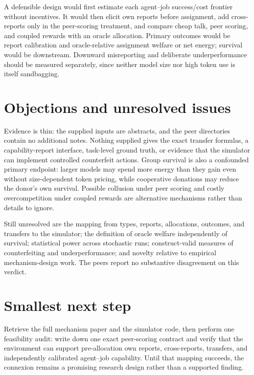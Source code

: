 \documentclass{article}
\begin{document}
A defensible design would first estimate each agent--job success/cost frontier without incentives.  It would then elicit own reports before assignment, add cross-reports only in the peer-scoring treatment, and compare cheap talk, peer scoring, and coupled rewards with an oracle allocation.  Primary outcomes would be report calibration and oracle-relative assignment welfare or net energy; survival would be downstream.  Downward misreporting and deliberate underperformance should be measured separately, since neither model size nor high token use is itself sandbagging. 

\section{Objections and unresolved issues}

Evidence is thin: the supplied inputs are abstracts, and the peer directories contain no additional notes.  Nothing supplied gives the exact transfer formulas, a capability-report interface, task-level ground truth, or evidence that the simulator can implement controlled counterfeit actions.  Group survival is also a confounded primary endpoint: larger models may spend more energy than they gain even without size-dependent token pricing, while cooperative donations may reduce the donor's own survival.  Possible collusion under peer scoring and costly overcompetition under coupled rewards are alternative mechanisms rather than details to ignore. 

Still unresolved are the mapping from types, reports, allocations, outcomes, and transfers to the simulator; the definition of oracle welfare independently of survival; statistical power across stochastic runs; construct-valid measures of counterfeiting and underperformance; and novelty relative to empirical mechanism-design work.  The peers report no substantive disagreement on this verdict. 

\section{Smallest next step}

Retrieve the full mechanism paper and the simulator code, then perform one feasibility audit: write down one exact peer-scoring contract and verify that the environment can support pre-allocation own reports, cross-reports, transfers, and independently calibrated agent--job capability.  Until that mapping succeeds, the connexion remains a promising research design rather than a supported finding.
\end{document}
